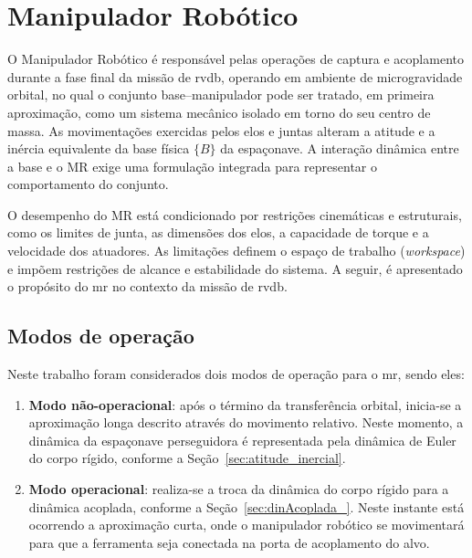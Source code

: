 \section{Manipulador Robótico}
\label{sec:manipulador_robotico}

O Manipulador Robótico é responsável pelas operações de captura e acoplamento durante a fase final da missão de \gls{rvdb}, operando em ambiente de microgravidade orbital, no qual o conjunto base--manipulador pode ser tratado, em primeira aproximação, como um sistema mecânico isolado em torno do seu centro de massa.
As movimentações exercidas pelos elos e juntas alteram a atitude e a inércia equivalente da base física $\{B\}$ da espaçonave.
A interação dinâmica entre a base e o MR exige uma formulação integrada para representar o comportamento do conjunto.

O desempenho do MR está condicionado por restrições cinemáticas e estruturais, como os limites de junta, as dimensões dos elos, a capacidade de torque e a velocidade dos atuadores.
As limitações definem o espaço de trabalho (\emph{workspace}) e impõem restrições de alcance e estabilidade do sistema.
A seguir, é apresentado o propósito do \gls{mr} no contexto da missão de \gls{rvdb}.

\subsection{Modos de operação}
\label{sec:MR_modos_operacao}

Neste trabalho foram considerados dois modos de operação para o \gls{mr}, sendo eles:
\begin{enumerate}[label=(\roman*)]
  \item \textbf{Modo não-operacional}: após o término da transferência orbital, inicia-se a aproximação longa descrito através do movimento relativo. Neste momento, a dinâmica da espaçonave perseguidora é representada pela dinâmica de Euler do corpo rígido, conforme a Seção~\ref{sec:atitude_inercial}.
  \item \textbf{Modo operacional}: realiza-se a troca da dinâmica do corpo rígido para a dinâmica acoplada, conforme a Seção~\ref{sec:dinAcoplada_}. Neste instante está ocorrendo a aproximação curta, onde o manipulador robótico se movimentará para que a ferramenta seja conectada na porta de acoplamento do alvo.
\end{enumerate}





